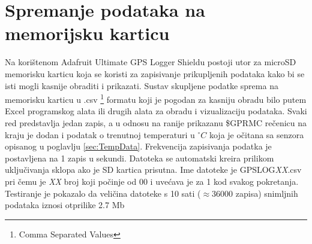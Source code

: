 \section{Spremanje podataka na memorijsku karticu}
Na korištenom Adafruit Ultimate GPS Logger Shieldu postoji utor za microSD memorisku karticu koja se koristi za zapisivanje prikupljenih podataka kako bi se isti mogli kasnije obraditi i prikazati.
Sustav skupljene podatke sprema na memorisku karticu u .csv \footnote{Comma Separated Values} formatu koji je pogodan za kasniju obradu bilo putem Excel programskog alata ili drugih alata za obradu i vizualizaciju podataka.
Svaki red predstavlja jedan zapis, a u odnosu na ranije prikazanu \$GPRMC rečenicu na kraju je dodan i podatak o trenutnoj temperaturi u $^\circ C$ koja je očitana sa senzora opisanog u poglavlju \ref{sec:TempData}.
Frekvencija zapisivanja podatka je postavljena na 1 zapis u sekundi.
Datoteka se automatski kreira prilikom uključivanja sklopa ako je SD kartica prisutna.
Ime datoteke je GPSLOG\textit{XX}.csv pri čemu je \textit{XX} broj koji počinje od 00 i uvećava je za 1 kod svakog pokretanja. Testiranje je pokazalo da veličina datoteke s 10 sati ($\approx 36000$ zapisa) snimljnih podataka iznosi otprilike 2.7 Mb






 
